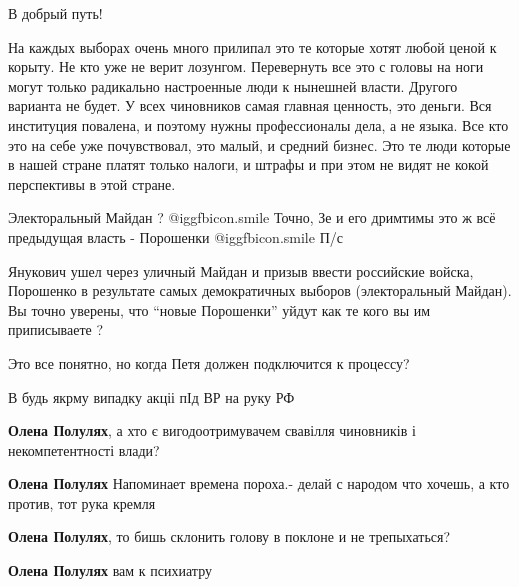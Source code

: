  
 
 
 
 
\zzSecCmt

\begin{itemize} %
В добрый путь!


На каждых выборах очень много прилипал это те которые хотят любой ценой к
корыту. Не кто уже не верит лозунгом. Перевернуть все это с головы на ноги
могут только радикально настроенные люди к нынешней власти. Другого варианта не
будет. У всех чиновников самая главная ценность, это деньги. Вся институция
повалена, и поэтому нужны профессионалы дела, а не языка. Все кто это на себе
уже почувствовал, это малый, и средний бизнес. Это те люди которые в нашей
стране платят только налоги, и штрафы и при этом не видят не кокой перспективы
в этой стране.

Электоральный Майдан ?  @igg{fbicon.smile} 
Точно, Зе и его дримтимы это ж всё предыдущая власть - Порошенки  @igg{fbicon.smile} 
П/с

Янукович ушел через уличный Майдан и призыв ввести российские войска, Порошенко
в результате самых демократичных выборов (электоральный Майдан). Вы точно
уверены, что \enquote{новые Порошенки} уйдут как те кого вы им приписываете ?

Это все понятно, но когда Петя должен подключится к процессу?

В будь якрму випадку акціі пІд ВР на руку РФ

\begin{itemize} %
\textbf{Олена Полулях}, а хто є вигодоотримувачем свавілля чиновників і некомпетентності влади?

\textbf{Олена Полулях} Напоминает времена пороха.- делай с народом что хочешь, а кто против, тот рука кремля

\textbf{Олена Полулях}, то бишь склонить голову в поклоне и не трепыхаться?

\textbf{Олена Полулях} вам к психиатру
\end{itemize} %


\end{itemize}
